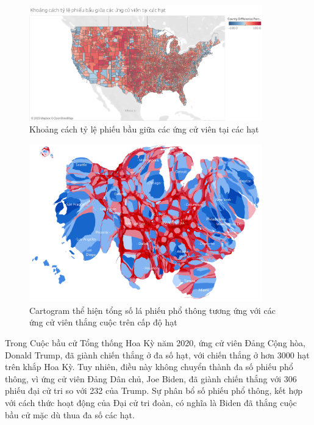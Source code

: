 \documentclass[14pt, a4paper]{article}
\numberwithin{equation}{section}
\numberwithin{figure}{section}
\numberwithin{dl}{section}
\numberwithin{md}{section}
\numberwithin{bd}{section}
\numberwithin{dn}{section}
\numberwithin{hq}{section}
\begin{document}
    \begin{figure}[h!]
        \centering
        \includegraphics[width=0.9\textwidth]{figures/County_Difference_Percentage_Total_Vote_Two_Candidate.png}
        \caption{Khoảng cách tỷ lệ phiếu bầu giữa các ứng cử viên tại các hạt}
    \end{figure}

    \begin{figure}[h!]
        \centering
        \includegraphics[width=0.9\textwidth]{figures/County_Total_Vote_Cartogram.png}
        \caption{Cartogram thể hiện tổng số lá phiếu phổ thông tương ứng với các ứng cử viên thắng cuộc trên cấp độ hạt}
    \end{figure}

    Trong Cuộc bầu cử Tổng thống Hoa Kỳ năm 2020, ứng cử viên Đảng Cộng hòa, Donald Trump, đã giành chiến thắng ở đa số hạt, với chiến thắng ở hơn 3000 hạt trên khắp Hoa Kỳ. 
    Tuy nhiên, điều này không chuyển thành đa số phiếu phổ thông, vì ứng cử viên Đảng Dân chủ, Joe Biden, đã giành chiến thắng với 306 phiếu đại cử tri so với 232 của Trump. 
    Sự phân bổ số phiếu phổ thông, kết hợp với cách thức hoạt động của Đại cử tri đoàn, có nghĩa là Biden đã thắng cuộc bầu cử mặc dù thua đa số các hạt.
\end{document}
